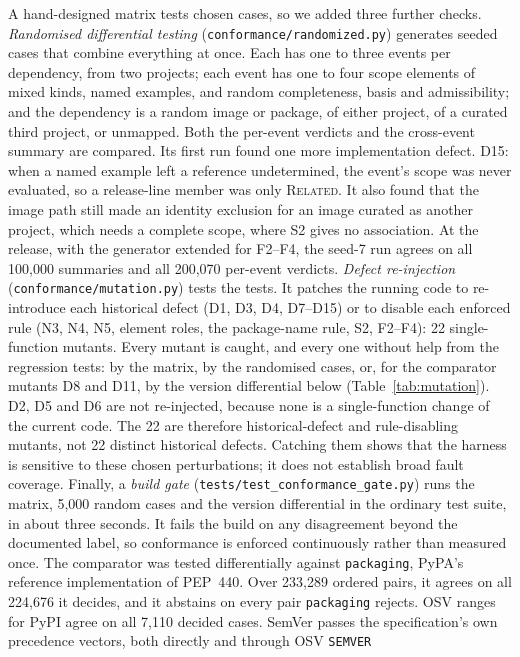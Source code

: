 \documentclass[11pt,a4paper]{article}
\newcommand{\code}[1]{\texttt{#1}}
\begin{document}
A hand-designed matrix tests chosen cases, so we added three further
checks. \emph{Randomised differential testing}
(\code{conformance/randomized.py}) generates seeded cases that combine
everything at once. Each has one to three events per dependency, from
two projects; each event has one to four scope elements of mixed
kinds, named examples, and random completeness, basis and
admissibility; and the dependency is a random image or package, of
either project, of a curated third project, or unmapped. Both the
per-event verdicts and the cross-event summary are compared. Its first
run found one more implementation defect. D15: when a named example
left a reference undetermined, the event's scope was never evaluated,
so a release-line member was only \textsc{Related}. It also found that
the image path still made an identity exclusion for an image curated
as another project, which needs a complete scope, where S2 gives no
association. At the release, with the generator extended for F2--F4,
the seed-7 run agrees on all 100{,}000 summaries and all 200{,}070
per-event verdicts.
\emph{Defect re-injection} (\code{conformance/mutation.py}) tests the
tests. It patches the running code to re-introduce each historical
defect (D1, D3, D4, D7--D15) or to disable each enforced rule (N3, N4,
N5, element roles, the package-name rule, S2, F2--F4): 22
single-function mutants.
Every mutant is caught, and every one without help
from the regression tests: by the matrix, by the randomised cases, or,
for the comparator mutants D8 and D11, by the version differential
below (Table~\ref{tab:mutation}). D2, D5 and D6 are not re-injected,
because none is a single-function change of the current code. The 22
are therefore historical-defect and rule-disabling mutants, not 22
distinct historical defects. Catching them shows that the harness is
sensitive to these chosen perturbations; it does not establish broad
fault coverage.
Finally, a \emph{build gate} (\code{tests/test\_conformance\_gate.py})
runs the matrix, 5{,}000 random cases and the version differential in
the ordinary test suite, in about three seconds. It fails the build on
any disagreement beyond the documented label, so conformance is
enforced continuously rather than measured once. The comparator was tested differentially against
\code{packaging}, PyPA's reference implementation of PEP~440. Over
233{,}289 ordered pairs, it agrees on all 224{,}676 it decides, and it
abstains on every pair \code{packaging} rejects. OSV ranges for PyPI
agree on all 7{,}110 decided cases. SemVer passes the specification's
own precedence vectors, both directly and through OSV \code{SEMVER}
\end{document}
